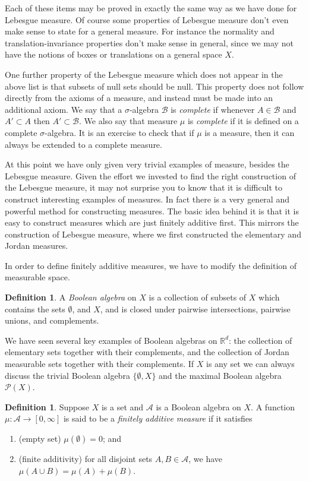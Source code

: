 \documentclass[11pt,oneside]{amsbook}
\newcommand{\RR}{{\mathbb R}}
\theoremstyle{definition}
\theoremstyle{plain}
\theoremstyle{definition}
\newtheorem{defn}[thm]{Definition}
\theoremstyle{remark}
\numberwithin{equation}{section}
\numberwithin{figure}{section}
\begin{document}
Each of these items may be proved in exactly the same way as we have done for Lebesgue measure. Of course some properties of Lebesgue measure don't even make sense to state for a general measure. For instance the normality and translation-invariance properties don't make sense in general, since we may not have the notions of boxes or translations on a general space $X$.

One further property of the Lebesgue measure which does not appear in the above list is that subsets of null sets should be null. This property does not follow directly from the axioms of a measure, and instead must be made into an additional axiom. We say that a $\sigma$-algebra $\mathcal B$ is \emph{complete} if whenever $A\in\mathcal B$ and $A'\subset A$ then $A'\subset\mathcal B$. We also say that measure $\mu$ is \emph{complete} if it is defined on a complete $\sigma$-algebra. It is an exercise to check that if $\mu$ is a measure, then it can always be extended to a complete measure.

At this point we have only given very trivial examples of measure, besides the Lebesgue measure. Given the effort we invested to find the right construction of the Lebesgue measure, it may not surprise you to know that it is difficult to construct interesting examples of measures. In fact there is a very general and powerful method for constructing measures. The basic idea behind it is that it is easy to construct measures which are just finitely additive first. This mirrors the construction of Lebesgue measure, where we first constructed the elementary and Jordan measures.

In order to define finitely additive measures, we have to modify the definition of measurable space.

\begin{defn}
  A \emph{Boolean algebra} on $X$ is a collection of subsets of $X$ which contains the sets $\emptyset$, and $X$, and is closed under pairwise intersections, pairwise unions, and complements.
\end{defn}

We have seen several key examples of Boolean algebras on $\RR^d$: the collection of elementary sets together with their complements, and the collection of Jordan measurable sets together with their complements. If $X$ is any set we can always discuss the trivial Boolean algebra $\{\emptyset,X\}$ and the maximal Boolean algebra $\mathcal P(X)$.

\begin{defn}
  Suppose $X$ is a set and $\mathcal A$ is a Boolean algebra on $X$. A function $\mu\colon\mathcal A\to[0,\infty]$ is said to be a \emph{finitely additive measure} if it satisfies
  \begin{enumerate}
  \item (empty set) $\mu(\emptyset)=0$; and
  \item (finite additivity) for all disjoint sets $A,B\in\mathcal A$, we have $\mu(A\cup B)=\mu(A)+\mu(B)$.
  \end{enumerate}
\end{defn}
\end{document}

